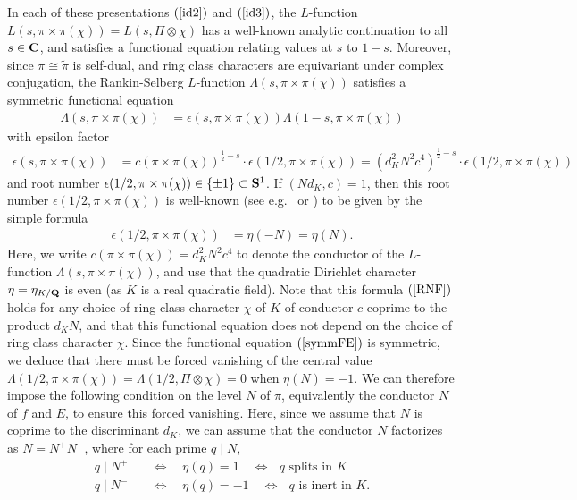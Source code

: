 \documentclass{amsart}
\theoremstyle{definition}
\begin{document}
In each of these presentations $(\ref{id2})$ and $(\ref{id3})$, the $L$-function $L(s, \pi \times \pi(\chi)) = L(s, \Pi \otimes \chi)$ has a well-known
analytic continuation to all $s \in {\bf{C}}$, and satisfies a functional equation relating values at $s$ to $1-s$. 
Moreover, since $\pi \cong \widetilde{\pi}$ is self-dual, and ring class characters are equivariant under complex conjugation, 
the Rankin-Selberg $L$-function $\Lambda(s, \pi \times \pi(\chi))$ satisfies a symmetric functional equation 
\begin{align}\label{symmFE} \Lambda(s, \pi \times \pi(\chi)) &= \epsilon(s, \pi \times \pi(\chi)) \Lambda(1-s, \pi \times \pi(\chi)) \end{align}
with epsilon factor 
\begin{align*} \epsilon(s, \pi \times \pi(\chi)) &= c(\pi \times \pi(\chi))^{\frac{1}{2} - s} \cdot \epsilon(1/2, \pi \times \pi(\chi)) 
= (d_K^2 N^2 c^4)^{\frac{1}{2} - s} \cdot \epsilon(1/2, \pi \times \pi(\chi))\end{align*}
and root number $\epsilon(1/2, \pi \times \pi(\chi)) \in \lbrace \pm 1 \rbrace \subset {\bf{S}}^1$.
If $(N d_K, c)=1$, then this root number $\epsilon(1/2, \pi \times \pi(\chi))$ is well-known (see e.g.~\cite[Proposition 4.1]{BaRa} or \cite[Theorem 2.2, Example 2]{Li}) to be given by the simple formula 
\begin{align}\label{RNF} \epsilon(1/2, \pi \times \pi(\chi)) &=  \eta(-N) = \eta(N). \end{align}
Here, we write $c(\pi \times \pi(\chi)) = d_K^2 N^2 c^4$ to denote the conductor of the $L$-function $\Lambda(s, \pi \times \pi(\chi))$,
and use that the quadratic Dirichlet character $\eta = \eta_{K/{\bf{Q}}}$ is even (as $K$ is a real quadratic field). 
Note that this formula $(\ref{RNF})$ holds for any choice of ring class character $\chi$ of $K$ of conductor $c$ coprime to the product $d_K N$,
and that this functional equation does not depend on the choice of ring class character $\chi$. 
Since the functional equation $(\ref{symmFE})$ is symmetric, we deduce that there must
be forced vanishing of the central value $\Lambda(1/2, \pi \times \pi(\chi)) = \Lambda(1/2, \Pi \otimes \chi) = 0$ when $\eta(N) = -1$. We can
therefore impose the following condition on the level $N$ of $\pi$, equivalently the conductor $N$ of $f$ and $E$, to ensure this forced vanishing.
Here, since we assume that $N$ is coprime to the discriminant $d_K$, we can assume that the conductor $N$ factorizes as $N = N^+ N^{-}$, 
where for each prime $q \mid N$,
\begin{align*} q \mid N^+ \quad &\iff \quad \eta(q) = 1 \quad \iff \text{ $q$ splits in $K$} \\
q \mid N^- \quad &\iff \quad \eta(q) = -1 \quad \iff \text{ $q$ is inert in $K$}. \end{align*} 
\end{document}
